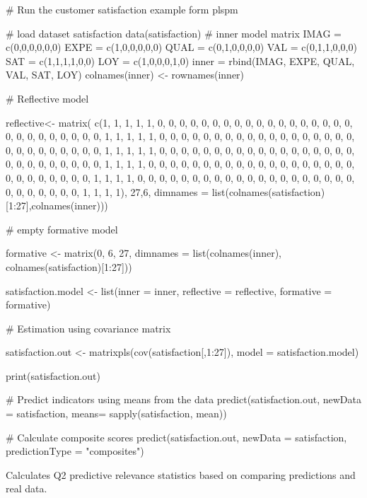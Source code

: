 \documentclass[a4paper]{book}
\begin{document}
%
\begin{Examples}
\begin{ExampleCode}
# Run the customer satisfaction example form plspm

# load dataset satisfaction
data(satisfaction)
# inner model matrix
IMAG = c(0,0,0,0,0,0)
EXPE = c(1,0,0,0,0,0)
QUAL = c(0,1,0,0,0,0)
VAL = c(0,1,1,0,0,0)
SAT = c(1,1,1,1,0,0)
LOY = c(1,0,0,0,1,0)
inner = rbind(IMAG, EXPE, QUAL, VAL, SAT, LOY)
colnames(inner) <- rownames(inner)

# Reflective model

reflective<- matrix(
  c(1, 1, 1, 1, 1, 0, 0, 0, 0, 0, 0, 0, 0, 0, 0, 0, 0, 0, 0, 0, 0, 0, 0, 0, 0, 0, 0,
    0, 0, 0, 0, 0, 1, 1, 1, 1, 1, 0, 0, 0, 0, 0, 0, 0, 0, 0, 0, 0, 0, 0, 0, 0, 0, 0,
    0, 0, 0, 0, 0, 0, 0, 0, 0, 0, 1, 1, 1, 1, 1, 0, 0, 0, 0, 0, 0, 0, 0, 0, 0, 0, 0,
    0, 0, 0, 0, 0, 0, 0, 0, 0, 0, 0, 0, 0, 0, 0, 1, 1, 1, 1, 0, 0, 0, 0, 0, 0, 0, 0,
    0, 0, 0, 0, 0, 0, 0, 0, 0, 0, 0, 0, 0, 0, 0, 0, 0, 0, 0, 1, 1, 1, 1, 0, 0, 0, 0,
    0, 0, 0, 0, 0, 0, 0, 0, 0, 0, 0, 0, 0, 0, 0, 0, 0, 0, 0, 0, 0, 0, 0, 1, 1, 1, 1),
  27,6, dimnames = list(colnames(satisfaction)[1:27],colnames(inner)))

# empty formative model

formative <- matrix(0, 6, 27, dimnames = list(colnames(inner),
                                              colnames(satisfaction)[1:27]))

satisfaction.model <- list(inner = inner,
                           reflective = reflective,
                           formative = formative)

# Estimation using covariance matrix


satisfaction.out <- matrixpls(cov(satisfaction[,1:27]),
                           model = satisfaction.model)

print(satisfaction.out)



# Predict indicators using means from the data
predict(satisfaction.out, 
        newData = satisfaction,
        means= sapply(satisfaction, mean))

# Calculate composite scores
predict(satisfaction.out, 
        newData = satisfaction,
        predictionType = "composites")
\end{ExampleCode}
\end{Examples}
%
\begin{Description}\relax
Calculates Q2 predictive relevance statistics based on comparing predictions
and real data.
\end{Description}
\end{document}
